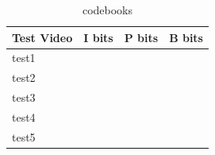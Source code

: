 \begin{table}[h!]
    \begin{center}
        \begin{tabular}{| l | l | l | l |}
        \hline
        Test Video & I bits  & P bits  & B bits       \\ \hline
        test1      &  &  &       \\ \hline
        test2      &  &  &       \\ \hline
        test3      &  &  &       \\ \hline
        test4      &  &  &       \\ \hline
        test5      &  &  &       \\ \hline
        \hline
        \end{tabular}
    \end{center}

    \caption{codebooks}
    \label{table:avgdata}
\end{table}

